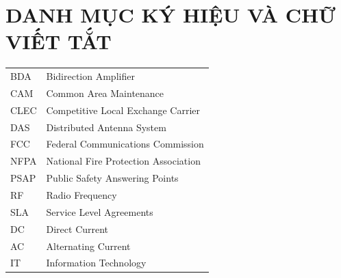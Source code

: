 \documentclass{thesis}
\begin{document}
\section*{DANH MỤC KÝ HIỆU VÀ CHỮ VIẾT TẮT}
 {}

\begin{tabular}{ l l }
  \hspace{1cm} BDA & \hspace{2cm} Bidirection Amplifier \\
  \hspace{1cm} CAM & \hspace{2cm} Common Area Maintenance \\
  \hspace{1cm} CLEC & \hspace{2cm} Competitive Local Exchange Carrier \\
  \hspace{1cm} DAS & \hspace{2cm} Distributed Antenna System \\
  \hspace{1cm} FCC & \hspace{2cm} Federal Communications Commission \\
  \hspace{1cm} NFPA & \hspace{2cm} National Fire Protection Association \\
  \hspace{1cm} PSAP & \hspace{2cm} Public Safety Answering Points \\
  \hspace{1cm} RF & \hspace{2cm} Radio Frequency \\
  \hspace{1cm} SLA & \hspace{2cm} Service Level Agreements \\
  \hspace{1cm} DC & \hspace{2cm} Direct Current \\
  \hspace{1cm} AC & \hspace{2cm} Alternating Current \\
  \hspace{1cm} IT & \hspace{2cm} Information Technology \\

\end{tabular}
\end{document}
